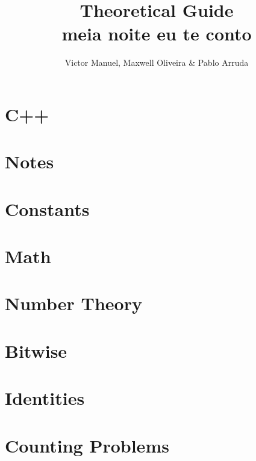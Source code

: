 \documentclass[10pt, twocolumn]{article}
\title{\vspace{-2cm}\textbf{Theoretical Guide\\meia noite eu te conto}}
\author{Victor Manuel, Maxwell Oliveira $\&$ Pablo Arruda}
\affil{\textit{Thanks to UFMG - Humuhumunukunukuapua'a}}
\date{}
\begin{document}
\maketitle\section{C++}






\section{Notes}

\section{Constants}



\section{Math}






\section{Number Theory}








\section{Bitwise}


\section{Identities}

\section{Counting Problems}

\end{document}
